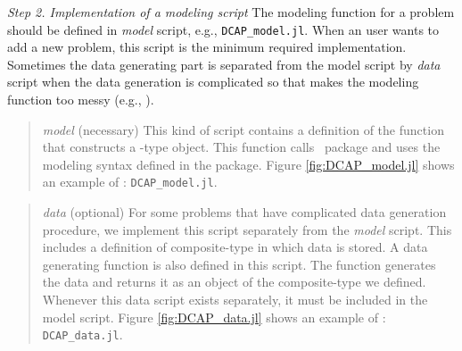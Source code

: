 \noindent\textit{Step 2. Implementation of a modeling script} The modeling function for a problem should be defined in \textit{model} script, e.g., \texttt{DCAP\_model.jl}. When an user wants to add a new problem, this script is the minimum required implementation. Sometimes the data generating part is separated from the model script by \textit{data} script when the data generation is complicated so that makes the modeling function too messy (e.g., \suc).
\begin{quote}
	\noindent\textit{model} (necessary) This kind of script contains a definition of the function that constructs a \jumpmodel-type object. This function calls \structjump\ package and uses the modeling syntax defined in the package. Figure \ref{fig:DCAP_model.jl} shows an example of \dcap: \texttt{DCAP\_model.jl}.
\end{quote}
\begin{quote}
	\noindent\textit{data} (optional) For some problems that have complicated data generation procedure, we implement this script separately from the \textit{model} script. This includes a definition of composite-type in which data is stored. A data generating function is also defined in this script. The function generates the data and returns it as an object of the composite-type we defined. Whenever this data script exists separately, it must be included in the model script. Figure \ref{fig:DCAP_data.jl} shows an example of \dcap: \texttt{DCAP\_data.jl}.
\end{quote}

